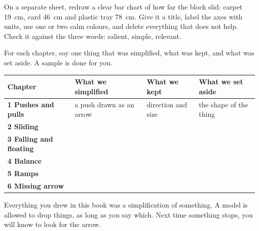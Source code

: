 \clearpage
\thispagestyle{fancy}
On a separate sheet, redraw a clear bar chart of how far the block slid: carpet 19~cm, card 46~cm and plastic tray 78~cm. Give it a title, label the axes with units, use one or two calm colours, and delete everything that does not help. Check it against the three words: salient, simple, relevant.

\begin{center}
\end{center}

\clearpage
\thispagestyle{fancy}
For each chapter, say one thing that was simplified, what was kept, and what was set aside. A sample is done for you.

\renewcommand{\arraystretch}{2.3}
\begin{center}\sffamily\scriptsize
\begin{tabularx}{\textwidth}{|>{\bfseries}p{2.1cm}|X|X|X|}
\hline
\textbf{Chapter} & \textbf{What we simplified} & \textbf{What we kept} & \textbf{What we set aside} \\ \hline
1 Pushes and pulls & a push drawn as an arrow & direction and size & the shape of the thing \\ \hline
2 Sliding & & & \\ \hline
3 Falling and floating & & & \\ \hline
4 Balance & & & \\ \hline
5 Ramps & & & \\ \hline
6 Missing arrow & & & \\ \hline
\end{tabularx}
\end{center}

\begin{multix}[wow]\multixbot[wow]\tcblower
Everything you drew in this book was a simplification of something. A model is allowed to drop things, as long as you say which. Next time something stops, you will know to look for the arrow.
\end{multix}

